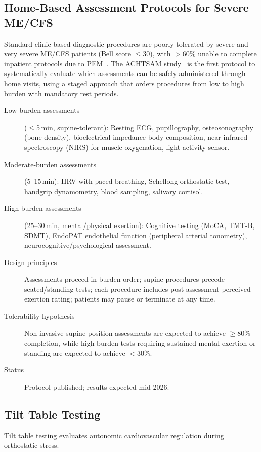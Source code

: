 \subsection{Home-Based Assessment Protocols for Severe ME/CFS}
\label{sec:home-based-assessments}

Standard clinic-based diagnostic procedures are poorly tolerated by severe and very severe ME/CFS patients (Bell score $\leq$30), with $>$60\% unable to complete inpatient protocols due to PEM~\cite{Fricke2026achtsam}. The ACHTSAM study~\cite{Fricke2026achtsam} is the first protocol to systematically evaluate which assessments can be safely administered through home visits, using a staged approach that orders procedures from low to high burden with mandatory rest periods.

\begin{description}
\item[Low-burden assessments] ($\leq$5\,min, supine-tolerant): Resting ECG, pupillography, osteosonography (bone density), bioelectrical impedance body composition, near-infrared spectroscopy (NIRS) for muscle oxygenation, light activity sensor.
\item[Moderate-burden assessments] (5--15\,min): HRV with paced breathing, Schellong orthostatic test, handgrip dynamometry, blood sampling, salivary cortisol.
\item[High-burden assessments] (25--30\,min, mental/physical exertion): Cognitive testing (MoCA, TMT-B, SDMT), EndoPAT endothelial function (peripheral arterial tonometry), neurocognitive/psychological assessment.
\item[Design principles] Assessments proceed in burden order; supine procedures precede seated/standing tests; each procedure includes post-assessment perceived exertion rating; patients may pause or terminate at any time.
\item[Tolerability hypothesis] Non-invasive supine-position assessments are expected to achieve $\geq$80\% completion, while high-burden tests requiring sustained mental exertion or standing are expected to achieve $<$30\%.
\item[Status] Protocol published; results expected mid-2026.
\end{description}

\subsection{Tilt Table Testing}

Tilt table testing evaluates autonomic cardiovascular regulation during orthostatic stress.


